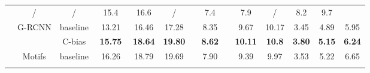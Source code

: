 \documentclass[runningheads]{llncs}
\begin{document}
\begin{table}[!t]
{\begin{tabular}{lccccccccccc}
                                                  & /                                          & /                      & 15.4
                                                  & 16.6                                       & /                      & ~ ~7.4~ ~
                                                  & 7.9                                        & /                      & 8.2
                                                  & 9.7                                                                                    \\
      \cline{2-12}
                                                  & \multirow{2}{*}{G-RCNN\cite{grcnn}}
                                                  & \multicolumn{1}{l}{baseline}               & 13.21                  & 16.46
                                                  & 17.28                                      & 8.35                   & 9.67
                                                  & 10.17                                      & 3.45                   & 4.89           &
      5.95                                                                                                                                 \\
                                                  &                                            &
      C-bias                                      & \textbf{15.75}                             & \textbf{18.64}
                                                  & \textbf{19.80}                             & \textbf{8.62}          & \textbf{10.11} &
      \textbf{10.8}                               & \textbf{3.80}                              & \textbf{5.15}          &
      \textbf{6.24}                                                                                                                        \\
      \cline{2-12}
                                                  & \multirow{2}{*}{Motifs\cite{motif}}
                                                  & baseline                                   & ~16.26~                & 18.79
                                                  & 19.69                                      & ~7.90~                 & 9.39
                                                  & 9.97                                       & 3.53                   & 5.22           &
      6.65                                                                                                                                 \\
                                                  &                                            &

\end{tabular}}
\end{table}
\end{document}
